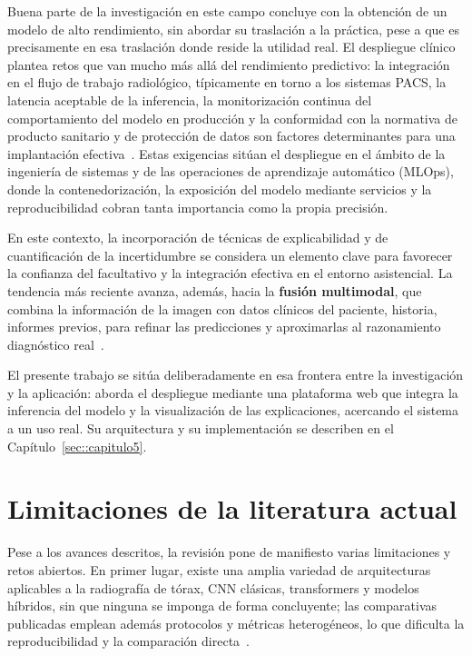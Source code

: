 Buena parte de la investigación en este campo concluye con la obtención de un
modelo de alto rendimiento, sin abordar su traslación a la práctica, pese a que es
precisamente en esa traslación donde reside la utilidad real. El despliegue
clínico plantea retos que van mucho más allá del rendimiento predictivo: la
integración en el flujo de trabajo radiológico, típicamente en torno a los
sistemas PACS, la latencia aceptable de la inferencia, la monitorización continua
del comportamiento del modelo en producción y la conformidad con la normativa de
producto sanitario y de protección de datos son factores determinantes para una
implantación efectiva~\cite{korfiatisImplementingArtificial2025}. Estas
exigencias sitúan el despliegue en el ámbito de la ingeniería de sistemas y de las
operaciones de aprendizaje automático (MLOps), donde la contenedorización, la
exposición del modelo mediante servicios y la reproducibilidad cobran tanta
importancia como la propia precisión.

En este contexto, la incorporación de técnicas de explicabilidad y de
cuantificación de la incertidumbre se considera un elemento clave para favorecer
la confianza del facultativo y la integración efectiva en el entorno asistencial.
La tendencia más reciente avanza, además, hacia la \textbf{fusión multimodal},
que combina la información de la imagen con datos clínicos del paciente, historia,
informes previos, para refinar las predicciones y aproximarlas al razonamiento
diagnóstico real~\cite{liReviewDeepLearning2024, yangEnhancingChestXray2025}.

El presente trabajo se sitúa deliberadamente en esa frontera entre la
investigación y la aplicación: aborda el despliegue mediante una plataforma web
que integra la inferencia del modelo y la visualización de las explicaciones,
acercando el sistema a un uso real. Su arquitectura y su implementación se
describen en el Capítulo~\ref{sec::capitulo5}.


\section{Limitaciones de la literatura actual}
\label{sec::ec_limitaciones}

Pese a los avances descritos, la revisión pone de manifiesto varias limitaciones
y retos abiertos. En primer lugar, existe una amplia variedad de arquitecturas
aplicables a la radiografía de tórax, CNN clásicas, transformers y modelos
híbridos, sin que ninguna se imponga de forma concluyente; las comparativas
publicadas emplean además protocolos y métricas heterogéneos, lo que dificulta
la reproducibilidad y la comparación
directa~\cite{bressemComparingDeepLearning2020, liuComprehensiveStudyRobustness2025}.

